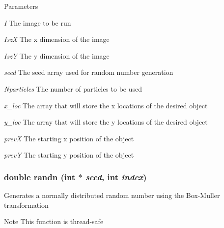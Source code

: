 \begin{DoxyParams}{Parameters}
\item[{\em I}]The image to be run \item[{\em IszX}]The x dimension of the image \item[{\em IszY}]The y dimension of the image \item[{\em seed}]The seed array used for random number generation \item[{\em Nparticles}]The number of particles to be used \item[{\em x\_\-loc}]The array that will store the x locations of the desired object \item[{\em y\_\-loc}]The array that will store the y locations of the desired object \item[{\em prevX}]The starting x position of the object \item[{\em prevY}]The starting y position of the object \end{DoxyParams}
\hypertarget{ex__particle__CUDA__naive_8cu_a4b441b42d0a8b6dc3a2b30db3be1d6b5}{
\subsubsection[{randn}]{\setlength{\rightskip}{0pt plus 5cm}double randn (int $\ast$ {\em seed}, \/  int {\em index})}}
\label{ex__particle__CUDA__naive_8cu_a4b441b42d0a8b6dc3a2b30db3be1d6b5}
Generates a normally distributed random number using the Box-\/Muller transformation \begin{DoxyNote}{Note}
This function is thread-\/safe 
\end{DoxyNote}

